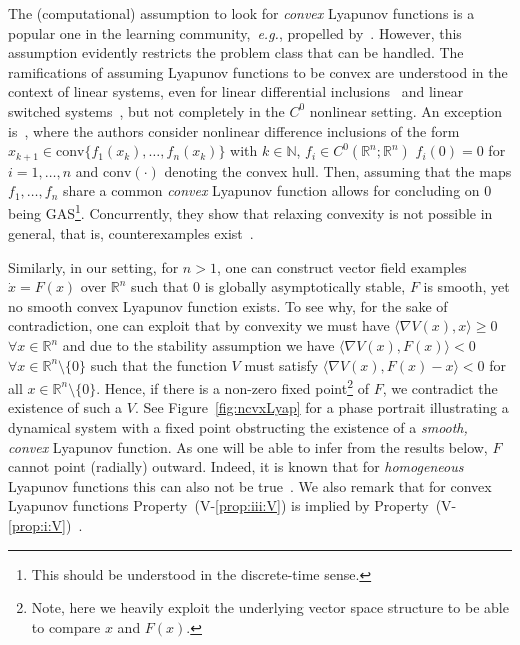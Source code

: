 \documentclass[letterpaper, 10 pt, conference]{ieeeconf}  %
\theoremstyle{mystyle}
\begin{document}
The (computational) assumption to look for \textit{convex} Lyapunov functions is a popular one in the learning community,~\textit{e.g.}, propelled by~\cite{ref:amos2017input,ref:kolter2019learning}. However, this assumption evidently restricts the problem class that can be handled. The ramifications of assuming Lyapunov functions to be convex are understood in the context of linear systems, even for linear differential inclusions~\cite{ref:goebel2006conjugate} and linear switched systems~\cite{ref:mason2023universal}, {but not completely in the $C^0$ nonlinear setting. An exception is~\cite{ref:ahmadi2018sos}, where the authors consider nonlinear difference inclusions of the form $x_{k+1}\in \mathrm{conv}\{f_1(x_k),\dots,f_n(x_k)\}$ with $k\in \mathbb{N}$, $f_i\in C^0(\mathbb{R}^n;\mathbb{R}^n)$ $f_i(0)=0$ for $i=1,\dots, n$ and $\mathrm{conv}(\cdot)$ denoting the convex hull. Then, assuming that the maps $f_1,\dots,f_n$ share a common \textit{convex} Lyapunov function allows for concluding on $0$ being GAS\footnote{This should be understood in the discrete-time sense.}. Concurrently, they show that relaxing convexity is not possible in general, that is, counterexamples exist~\cite[Ex.~1]{ref:ahmadi2018sos}.}

Similarly, in our setting, for $n>1$, one can construct vector field examples $\dot{x}=F(x)$ over $\mathbb{R}^n$ such that $0$ is globally asymptotically stable, $F$ is smooth, yet no smooth convex Lyapunov function exists. To see why, for the sake of contradiction, one can exploit that by convexity we must have 
$
    \langle \nabla V(x), x\rangle \geq 0$ $\forall x\in \mathbb{R}^n
$
and due to the stability assumption we have
$
    \langle \nabla V(x),F(x)\rangle <0$ $ \forall x\in \mathbb{R}^n\setminus\{0\}
$
such that the function $V$ must satisfy $\langle \nabla V(x), F(x)-x \rangle < 0$ for all $x\in \mathbb{R}^n\setminus \{0\}$. Hence, if there is a non-zero fixed point\footnote{Note, here we heavily exploit the underlying vector space structure to be able to compare $x$ and $F(x)$.} of $F$, we contradict the existence of such a $V$. {See Figure~\ref{fig:ncvxLyap} for a phase portrait illustrating a dynamical system with a fixed point obstructing the existence of a \textit{smooth, convex} Lyapunov function.} As one will be able to infer from the results below, $F$ cannot point (radially) outward. Indeed, it is known that for \textit{homogeneous} Lyapunov functions this can also not be true~\cite[Prop.~1]{ref:sepulchre1996homogeneous}. {We also remark that for convex Lyapunov functions Property~(V-\ref{prop:iii:V}) is implied by Property~(V-\ref{prop:i:V})~\cite[Lem.~4.1]{ref:ahmadi2018sos}.}
\end{document}
